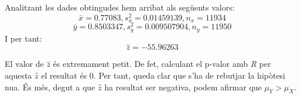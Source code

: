 Analitzant les dades obtingudes hem arribat als següents valors:
$$\bar{x} = 0.77083, s^2_x = 0.01459139, n_x = 11934$$
$$\bar{y} = 0.8503347, s^2_y = 0.009507904, n_y = 11950$$
I per tant:
$$\hat{z} = -55.96263$$


El valor de $\hat{z}$ és extremament petit. De fet, calculant el p-valor amb \emph{R} per aquesta $\hat{z}$ el resultat és 0. Per tant, queda clar que s'ha de rebutjar la hipòtesi nu\lgem a. És més, degut a que $\hat{z}$ ha resultat ser negativa, podem afirmar que $\mu_Y > \mu_X$.